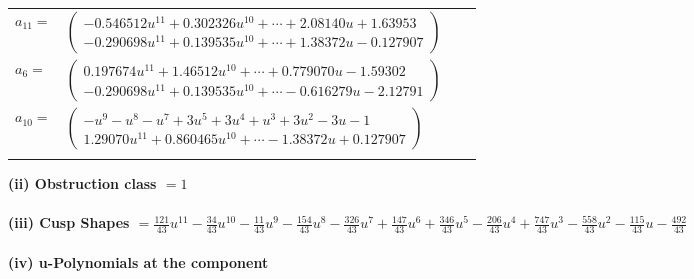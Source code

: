 \documentclass[1p]{elsarticle_modified}
\theoremstyle{definition}
\begin{document}
\begin{tabular}{m{7pt} m{180pt} m{7pt} m{180pt} }
\flushright $a_{11}=$&$\begin{pmatrix}-0.546512 u^{11}+0.302326 u^{10}+\cdots+2.08140 u+1.63953\\-0.290698 u^{11}+0.139535 u^{10}+\cdots+1.38372 u-0.127907\end{pmatrix}$ \\
\flushright $a_{6}=$&$\begin{pmatrix}0.197674 u^{11}+1.46512 u^{10}+\cdots+0.779070 u-1.59302\\-0.290698 u^{11}+0.139535 u^{10}+\cdots-0.616279 u-2.12791\end{pmatrix}$ \\
\flushright $a_{10}=$&$\begin{pmatrix}- u^9- u^8- u^7+3 u^5+3 u^4+u^3+3 u^2-3 u-1\\1.29070 u^{11}+0.860465 u^{10}+\cdots-1.38372 u+0.127907\end{pmatrix}$\\&\end{tabular}
\flushleft \textbf{(ii) Obstruction class $= 1$}\\~\\
\flushleft \textbf{(iii) Cusp Shapes $= \frac{121}{43} u^{11}-\frac{34}{43} u^{10}-\frac{11}{43} u^9-\frac{154}{43} u^8-\frac{326}{43} u^7+\frac{147}{43} u^6+\frac{346}{43} u^5-\frac{206}{43} u^4+\frac{747}{43} u^3-\frac{558}{43} u^2-\frac{115}{43} u-\frac{492}{43}$}\\~\\
\newpage\renewcommand{\arraystretch}{1}
\flushleft \textbf{(iv) u-Polynomials at the component}\newline \\
\end{document}
